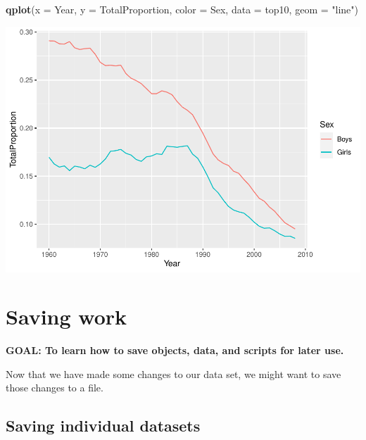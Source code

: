 \documentclass[
]{book}
\newenvironment{Shaded}{\begin{snugshade}}{\end{snugshade}}
\newcommand{\DataTypeTok}[1]{\textcolor[rgb]{0.13,0.29,0.53}{#1}}
\newcommand{\KeywordTok}[1]{\textcolor[rgb]{0.13,0.29,0.53}{\textbf{#1}}}
\newcommand{\NormalTok}[1]{#1}
\newcommand{\StringTok}[1]{\textcolor[rgb]{0.31,0.60,0.02}{#1}}
\begin{document}
\begin{alert}
\begin{enumerate}
\begin{Shaded}
\begin{Highlighting}[]
\KeywordTok{qplot}\NormalTok{(}\DataTypeTok{x =}\NormalTok{ Year, }
      \DataTypeTok{y =}\NormalTok{ TotalProportion, }
      \DataTypeTok{color =}\NormalTok{ Sex,}
      \DataTypeTok{data =}\NormalTok{ top10,}
      \DataTypeTok{geom =} \StringTok{"line"}\NormalTok{)}
\end{Highlighting}
\end{Shaded}

  \includegraphics{R/Rintro/figures/unnamed-chunk-72-1.pdf}
\end{enumerate}

\end{alert}

\hypertarget{saving-work}{%
\section{Saving work}\label{saving-work}}

\begin{alert}

\textbf{GOAL: To learn how to save objects, data, and scripts for later use.}

\end{alert}

Now that we have made some changes to our data set, we might want to
save those changes to a file.

\hypertarget{saving-individual-datasets}{%
\subsection{Saving individual datasets}\label{saving-individual-datasets}}
\end{document}
